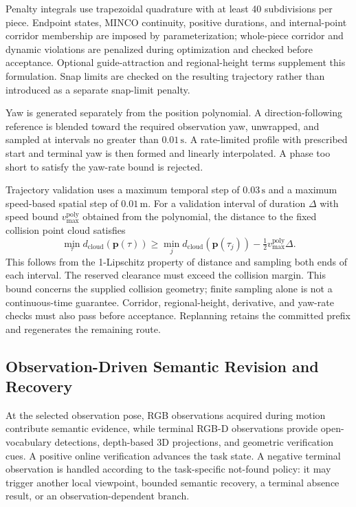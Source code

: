 \documentclass[letterpaper,10pt,journal]{IEEEtran}
\begin{document}
Penalty integrals use trapezoidal quadrature with at least 40 subdivisions per piece. Endpoint states, MINCO continuity, positive durations, and internal-point corridor membership are imposed by parameterization; whole-piece corridor and dynamic violations are penalized during optimization and checked before acceptance. Optional guide-attraction and regional-height terms supplement this formulation. Snap limits are checked on the resulting trajectory rather than introduced as a separate snap-limit penalty.

Yaw is generated separately from the position polynomial. A direction-following reference is blended toward the required observation yaw, unwrapped, and sampled at intervals no greater than $0.01\,\mathrm s$. A rate-limited profile with prescribed start and terminal yaw is then formed and linearly interpolated. A phase too short to satisfy the yaw-rate bound is rejected.

Trajectory validation uses a maximum temporal step of $0.03\,\mathrm s$ and a maximum speed-based spatial step of $0.01\,\mathrm m$. For a validation interval of duration $\Delta$ with speed bound $v_{\max}^{\mathrm{poly}}$ obtained from the polynomial, the distance to the fixed collision point cloud satisfies
\begin{equation}
\min_{\tau}d_{\mathrm{cloud}}(\mathbf p(\tau))
\geq \min_j d_{\mathrm{cloud}}(\mathbf p(\tau_j))
-\tfrac12v_{\max}^{\mathrm{poly}}\Delta.
\label{eq:clearance-bound}
\end{equation}
This follows from the 1-Lipschitz property of distance and sampling both ends of each interval. The reserved clearance must exceed the collision margin. This bound concerns the supplied collision geometry; finite sampling alone is not a continuous-time guarantee. Corridor, regional-height, derivative, and yaw-rate checks must also pass before acceptance. Replanning retains the committed prefix and regenerates the remaining route.

\subsection{Observation-Driven Semantic Revision and Recovery}
\label{sec:recovery}

At the selected observation pose, RGB observations acquired during motion contribute semantic evidence, while terminal RGB-D observations provide open-vocabulary detections, depth-based 3D projections, and geometric verification cues. A positive online verification advances the task state. A negative terminal observation is handled according to the task-specific not-found policy: it may trigger another local viewpoint, bounded semantic recovery, a terminal absence result, or an observation-dependent branch.
\end{document}
